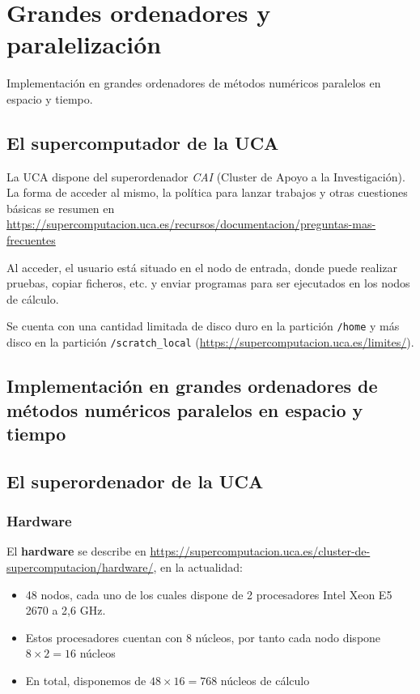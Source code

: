 
\section{Grandes ordenadores y paralelización}

\begin{contenidos}
Implementación en grandes ordenadores de métodos numéricos paralelos en espacio y tiempo.
\end{contenidos}

\subsection{El supercomputador de la UCA}
\label{sec:supercomputador-UCA}
La UCA dispone del superordenador \textit{CAI} (Cluster de Apoyo a la
Investigación).  La forma de acceder al mismo, la política para lanzar
trabajos y otras cuestiones básicas se resumen en
\url{https://supercomputacion.uca.es/recursos/documentacion/preguntas-mas-frecuentes}

Al acceder, el usuario está situado en el nodo de entrada, donde puede
realizar pruebas, copiar ficheros, etc. y enviar programas para ser
ejecutados en los nodos de cálculo.

Se cuenta con una cantidad limitada de disco duro en la partición
\texttt{/home} y más disco en la partición \texttt{/scratch\_local}
(\url{https://supercomputacion.uca.es/limites/}).

\subsection{Implementación en grandes ordenadores de métodos numéricos paralelos en espacio y tiempo}

\subsection{El superordenador de la UCA}

\subsubsection*{Hardware}
El \textbf{hardware} se describe en
\url{https://supercomputacion.uca.es/cluster-de-supercomputacion/hardware/},
en la actualidad:
\begin{itemize}
\item 48 nodos, cada uno de los cuales dispone de 2 procesadores Intel Xeon E5 2670 a 2,6 GHz.
\item Estos procesadores cuentan con 8 núcleos, por tanto cada nodo dispone $8\times 2=16$ núcleos
\item En total, disponemos de $48\times 16=768$ núcleos de cálculo
\end{itemize}

